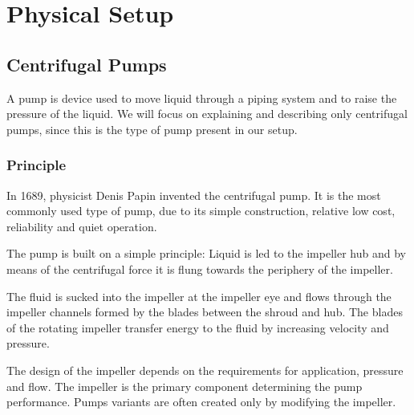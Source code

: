 \chapter{Physical Setup}\label{ch:physsetup}
\section{Centrifugal Pumps}

A pump is device used to move liquid through a piping system and to raise the pressure of the liquid. We will focus on explaining 
and describing only centrifugal pumps, since this is the type of pump present in our setup. 

\subsection{Principle}

In 1689, physicist Denis Papin invented the centrifugal pump. It is the most commonly used type of pump,
due to its simple construction, relative low cost, reliability and quiet operation.

The pump is built on a simple principle: Liquid is led to the impeller hub and by means of the centrifugal force
it is flung towards the periphery of the impeller. 

The fluid is sucked into the impeller at the impeller eye and flows through the impeller channels formed by the 
blades between the shroud and hub.
The blades of the rotating impeller transfer energy to the fluid by increasing velocity and pressure.

The design of the impeller depends on the requirements for application, pressure and flow.
The impeller is the primary component determining the pump performance. 
Pumps variants are often created only by modifying the impeller.

